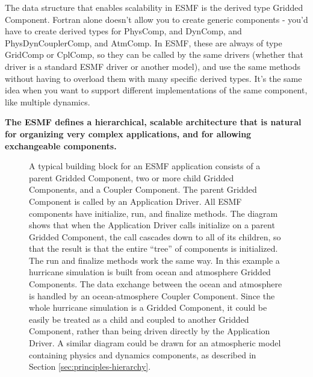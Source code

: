 The data structure that enables scalability in ESMF is the
derived type Gridded Component.  Fortran alone doesn't allow you to create
generic components - you'd have to create derived types for
PhysComp, and DynComp, and PhysDynCouplerComp, and AtmComp.  In 
ESMF, these are always of type GridComp or CplComp, so they 
can be called by the same drivers (whether that driver is a 
standard ESMF driver or another model), and use the same methods
without having to overload them with many specific derived 
types.  It's the same idea when you want to support different 
implementations of the same component, like multiple dynamics.

{\bf The ESMF defines a hierarchical, scalable architecture 
that is natural for organizing very complex applications, and
for allowing exchangeable components.}

\begin{figure}
\caption{A typical building block for an ESMF application consists 
of a parent Gridded Component, two or more child Gridded Components, and 
a Coupler Component.  The parent Gridded Component is called by an 
Application Driver.  All ESMF components have initialize, run, and 
finalize methods.  The diagram shows that when the Application Driver calls 
initialize on a parent Gridded Component, the call cascades down to
all of its children, so that the result is that the entire ``tree''
of components is initialized.  The run and finalize methods work the
same way.  In this example a hurricane simulation is built 
from ocean and atmosphere Gridded Components.  The data exchange between 
the ocean and atmosphere is handled by an ocean-atmosphere Coupler Component.  
Since the whole hurricane simulation is a Gridded Component,
it could be easily be treated as a child and coupled to another
Gridded Component, rather than being driven directly by the Application 
Driver.  A similar diagram could be drawn for an atmospheric model containing
physics and dynamics components, as described in Section 
\ref{sec:principles-hierarchy}.}
\label{fig:appunit}
\end{figure}

